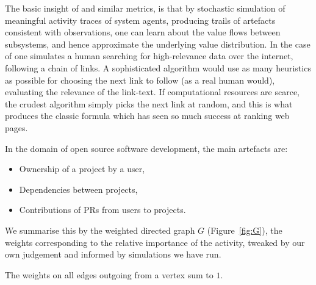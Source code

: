 The basic insight of \pagerank{} and similar metrics, is that by
stochastic simulation of meaningful activity traces of system agents,
producing trails of artefacts consistent with observations, one can
learn about the value flows between subsystems, and hence approximate
the underlying value distribution. In the case of \pagerank{} one
simulates a human searching for high-relevance data over the internet,
following a chain of links. A sophisticated algorithm would use as
many heuristics as possible for choosing the next link to follow (as a
real human would), \eg{} evaluating the relevance of the link-text. If
computational resources are scarce, the crudest algorithm simply picks
the next link at random, and this is what produces the classic
\pagerank{} formula which has seen so much success at ranking web
pages.

In the domain of open source software development, the main artefacts
are:
\begin{itemize}
  \item Ownership of a project by a user,
  \item Dependencies between projects,
  \item Contributions of PRs from users to projects.
\end{itemize}

We summarise this by the weighted directed graph $G$ (Figure~\ref{fig:G}), the
weights corresponding to the relative importance of the activity, tweaked by
our own judgement and informed by simulations we have run.

\begin{center}
\label{fig:G}
\end{center}

The weights on all edges outgoing from a vertex sum to $1$.

